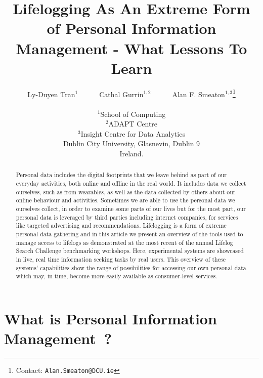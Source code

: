 \documentclass[11pt]{article}
\begin{document}
\title{Lifelogging As An Extreme Form of Personal Information Management - What Lessons To Learn}

\author{Ly-Duyen Tran$^1$~~~~~~Cathal Gurrin$^{1,2}$~~~~~~Alan F. Smeaton$^{1,3}$\thanks{Contact: \texttt{Alan.Smeaton@DCU.ie}}\\ \\
$^1$School of Computing\\
$^2$ADAPT Centre\\
$^3$Insight Centre for Data Analytics\\
Dublin City University, 
Glasnevin, Dublin 9\\
Ireland.}

\maketitle

\begin{abstract}
Personal data includes the digital footprints that we leave behind as part of our everyday activities, both online and offline in the real world. It includes data we collect ourselves, such as from wearables, as well as the data collected by others about our online behaviour and activities.  Sometimes we are able to use the personal data we ourselves collect, in order to examine some parts of our lives but for the most part, our personal data is leveraged by third parties including internet companies, for services like targeted advertising and recommendations. Lifelogging is a form of extreme personal data gathering and in this article we present an overview of the tools used to manage access to lifelogs as demonstrated at the most recent of the annual Lifelog Search Challenge benchmarking workshops. Here, experimental systems are showcased in live, real time information seeking tasks by real users. This overview of these systems' capabilities show the range of possibilities for accessing our own personal data which may, in time, become more easily available as consumer-level services.
\end{abstract}



\section{What is Personal Information Management~?}
\end{document}

